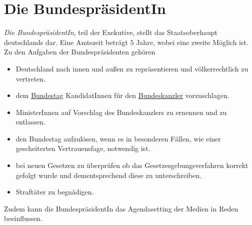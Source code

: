 \documentclass{article}
\begin{document}
\section{Die BundespräsidentIn} 
\emph{Die BundespräsidentIn}, teil der Exekutive, stellt das Staatsoberhaupt deutschlands dar. Eine Amtszeit beträgt $5$ Jahre, wobei eine zweite Möglich ist. 
Zu den Aufgaben der Bundespräsidenten gehören
\begin{itemize}
 \item Deutschland nach innen und außen zu repräsentieren und völkerrechtlich zu vertreten.
 \item dem \hyperref[Der Bundestag]{Bundestag} KandidatInnen für den \hyperref[Der Bundeskanzler]{Bundeskanzler} vorzuschlagen.
 \item MinisterInnen auf Vorschlag des Bundeskanzlers zu ernennen und zu entlassen.
 \item den Bundestag aufzulösen, wenn es in besonderen Fällen, wie einer gescheiterten Vertrauensfage, notwendig ist.
 \item bei neuen Gesetzen zu überprüfen ob das Gesetzesgebungsverfahren korrekt gefolgt wurde und dementsprechend diese zu unterschreiben.
 \item Straftäter zu begnädigen. 
\end{itemize} 
Zudem kann die BundespräsidentIn das Agendasetting der Medien in Reden beeinflussen.
\end{document}
